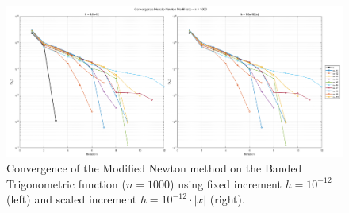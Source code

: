 \documentclass[a4paper,12pt]{article}
\begin{document}
	\begin{figure}[htbp]
		\centering
		\includegraphics[width=\textwidth]{../immagini/banded_1k_h12.png}
		\caption{Convergence of the Modified Newton method on the Banded Trigonometric function ($n=1000$) using fixed increment $h = 10^{-12}$ (left) and scaled increment $h = 10^{-12}\cdot|x|$ (right).}
		\label{fig:bt_fd_1k_h12}
	\end{figure}
	\newpage
\end{document}
